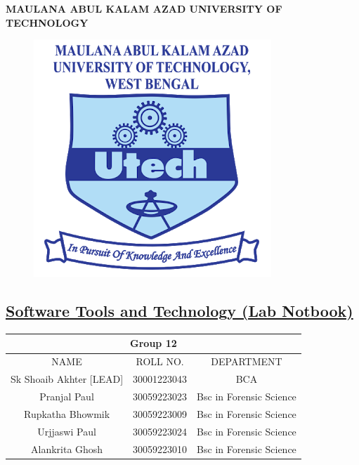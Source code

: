 \documentclass{article}
\begin{document}
\begin{center}
    \huge\textbf{MAULANA ABUL KALAM AZAD UNIVERSITY OF TECHNOLOGY}\\

\end{center}
\begin{figure}[h!]
    \centering
    \includegraphics[width=0.3\linewidth]{makaut.png}
\end{figure}
\date{\today} 
\begin{center}
    \section*{\textbf{\underline{Software Tools and Technology (Lab Notbook)}}}
    \vspace{0.4cm}
\end{center}
\begin{center}

\vspace{0.2 cm}
\renewcommand{\arraystretch}{2}
\hspace*{0.08in}
\begin{tabular}{ |c|c|c| }
\hline
\multicolumn{3}{|c|}{\Large \textbf{Group 12}} \\
\hline
NAME & ROLL NO.& DEPARTMENT \\
\hline
Sk Shoaib Akhter [LEAD]& 30001223043& BCA \\
\hline
Pranjal Paul& 30059223023& Bsc in Forensic Science\\
\hline
Rupkatha Bhowmik& 30059223009& Bsc in Forensic Science\\
\hline
Urjjaswi Paul& 30059223024& Bsc in Forensic Science\\
\hline
Alankrita Ghosh& 30059223010& Bsc in Forensic Science\\
\hline
\end{tabular}

\end{center}
\end{document}
